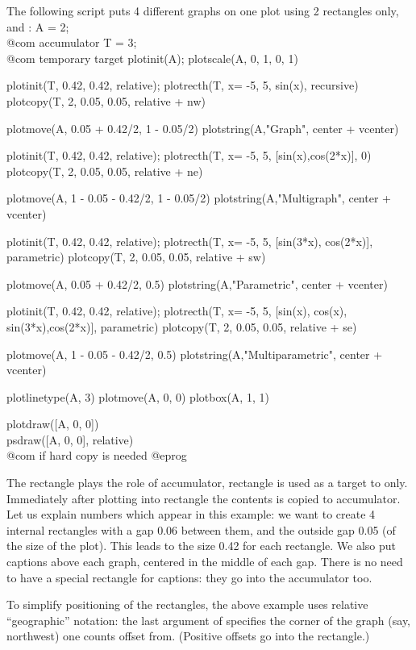 The following script puts 4 different graphs on one plot using 2 rectangles
only,  and :
\bprog
A = 2;   \\@com accumulator
T = 3;   \\@com temporary target
plotinit(A);         plotscale(A, 0, 1, 0, 1)

plotinit(T, 0.42, 0.42, relative);
plotrecth(T, x= -5, 5, sin(x), recursive)
plotcopy(T, 2, 0.05, 0.05, relative + nw)

plotmove(A, 0.05 + 0.42/2, 1 - 0.05/2)
plotstring(A,"Graph", center + vcenter)

plotinit(T, 0.42, 0.42, relative);
plotrecth(T, x= -5, 5, [sin(x),cos(2*x)], 0)
plotcopy(T, 2, 0.05, 0.05, relative + ne)

plotmove(A, 1 - 0.05 - 0.42/2, 1 - 0.05/2)
plotstring(A,"Multigraph", center + vcenter)

plotinit(T, 0.42, 0.42, relative);
plotrecth(T, x= -5, 5, [sin(3*x), cos(2*x)], parametric)
plotcopy(T, 2, 0.05, 0.05, relative + sw)

plotmove(A, 0.05 + 0.42/2, 0.5)
plotstring(A,"Parametric", center + vcenter)

plotinit(T, 0.42, 0.42, relative);
plotrecth(T, x= -5, 5, [sin(x), cos(x), sin(3*x),cos(2*x)], parametric)
plotcopy(T, 2, 0.05, 0.05, relative + se)

plotmove(A, 1 - 0.05 - 0.42/2, 0.5)
plotstring(A,"Multiparametric", center + vcenter)

plotlinetype(A, 3)
plotmove(A, 0, 0)
plotbox(A, 1, 1)

plotdraw([A, 0, 0])
\\ psdraw([A, 0, 0], relative)          \\ @com if hard copy is needed
@eprog

The rectangle  plays the role of accumulator, rectangle  is
used as a target to  only.  Immediately after plotting into 
rectangle  the contents is copied to accumulator.  Let us explain
numbers which appear in this example: we want to create 4 internal rectangles
with a gap 0.06 between them, and the outside gap 0.05 (of the size of the
plot).  This leads to the size 0.42 for each rectangle.  We also
put captions above each graph, centered in the middle of each gap.  There
is no need to have a special rectangle for captions: they go into the
accumulator too.

To simplify positioning of the rectangles, the above example uses relative
``geographic'' notation: the last argument of  specifies the
corner of the graph (say, northwest) one counts offset from. (Positive
offsets go into the rectangle.)

